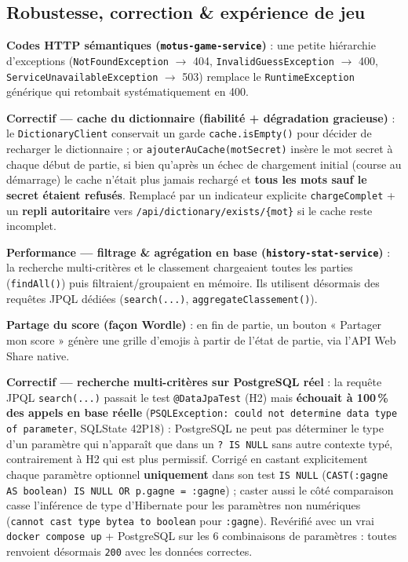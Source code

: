 \documentclass[a4paper,11pt]{article}
\begin{document}
\subsection{Robustesse, correction \& exp\'erience de jeu}

\textbf{Codes HTTP s\'emantiques (\texttt{motus-game-service})} : une petite hi\'erarchie d'exceptions (\texttt{NotFoundException} $\rightarrow$ 404, \texttt{InvalidGuessException} $\rightarrow$ 400, \texttt{ServiceUnavailableException} $\rightarrow$ 503) remplace le \texttt{RuntimeException} g\'en\'erique qui retombait syst\'ematiquement en 400.

\textbf{Correctif --- cache du dictionnaire (fiabilit\'e + d\'egradation gracieuse)} : le \texttt{DictionaryClient} conservait un garde \texttt{cache.isEmpty()} pour d\'ecider de recharger le dictionnaire ; or \texttt{ajouterAuCache(motSecret)} ins\`ere le mot secret \`a chaque d\'ebut de partie, si bien qu'apr\`es un \'echec de chargement initial (course au d\'emarrage) le cache n'\'etait plus jamais recharg\'e et \textbf{tous les mots sauf le secret \'etaient refus\'es}. Remplac\'e par un indicateur explicite \texttt{chargeComplet} + un \textbf{repli autoritaire} vers \texttt{/api/dictionary/exists/\{mot\}} si le cache reste incomplet.

\textbf{Performance --- filtrage \& agr\'egation en base (\texttt{history-stat-service})} : la recherche multi-crit\`eres et le classement chargeaient toutes les parties (\texttt{findAll()}) puis filtraient/groupaient en m\'emoire. Ils utilisent d\'esormais des requ\^etes JPQL d\'edi\'ees (\texttt{search(...)}, \texttt{aggregateClassement()}).

\textbf{Partage du score (fa\c{c}on Wordle)} : en fin de partie, un bouton « Partager mon score » g\'en\`ere une grille d'emojis \`a partir de l'\'etat de partie, via l'API Web Share native.

\textbf{Correctif --- recherche multi-crit\`eres sur PostgreSQL r\'eel} : la requ\^ete JPQL \texttt{search(...)} passait le test \texttt{@DataJpaTest} (H2) mais \textbf{\'echouait \`a 100\,\% des appels en base r\'eelle} (\texttt{PSQLException: could not determine data type of parameter}, SQLState 42P18) : PostgreSQL ne peut pas d\'eterminer le type d'un param\`etre qui n'appara\^it que dans un \texttt{? IS NULL} sans autre contexte typ\'e, contrairement \`a H2 qui est plus permissif. Corrig\'e en castant explicitement chaque param\`etre optionnel \textbf{uniquement} dans son test \texttt{IS NULL} (\texttt{CAST(:gagne AS boolean) IS NULL OR p.gagne = :gagne}) ; caster aussi le c\^ot\'e comparaison casse l'inf\'erence de type d'Hibernate pour les param\`etres non num\'eriques (\texttt{cannot cast type bytea to boolean} pour \texttt{:gagne}). Rev\'erifi\'e avec un vrai \texttt{docker compose up} + PostgreSQL sur les 6 combinaisons de param\`etres : toutes renvoient d\'esormais \texttt{200} avec les donn\'ees correctes.
\end{document}
